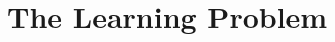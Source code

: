 \documentclass[12 pt]{article}
\newtheorem{Definition}{Definition}[]
\begin{document}




\section{The Learning Problem}\label{ch3}



\end{document}
